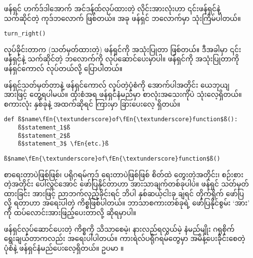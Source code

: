 ဖန်ရှင် ဟက်ဒ်ဒါအောက် အင်ဒန့်ထ်လုပ်ထားတဲ့ လိုင်းအားလုံးဟာ ၎င်းဖန်ရှင်နဲ့ သက်ဆိုင်တဲ့ ကုဒ်ဘလောက် ဖြစ်တယ်။ အခု  ဖန်ရှင် ဘလောက်မှာ  သုံးကြိမ်ပါတယ်။ 
%
\setlength{\fboxsep}{0pt}
\begin{verbatim}
turn_right()
\end{verbatim}
%
လုပ်ခိုင်းတာက (သတ်မှတ်ထားတဲ့) ဖန်ရှင်ကို အသုံးပြုတာ ဖြစ်တယ်။ ဒီအခါမှာ ၎င်းဖန်ရှင်နဲ့ သက်ဆိုင်တဲ့ ဘလောက်ကို လုပ်ဆောင်ပေးမှာပါ။ ဖန်ရှင်ကို အသုံးပြုတာကို ဖန်ရှင်ကောလ်  လုပ်တယ်လို့ ပြောပါတယ်။

ဖန်ရှင်သတ်မှတ်တာနဲ့ ဖန်ရှင်ကောလ် လုပ်တဲ့ပုံစံကို အောက်ပါအတိုင်း ယေဘုယျအားဖြင့် တွေ့ရပါမယ်။  ထုံးစံအရ ဖန်ရှင်နံမည်မှာ စာလုံးအသေးကိုပဲ သုံးလေ့ရှိတယ်။ စကားလုံး နှစ်ခုနဲ့ အထက်ဆိုရင် ကြားမှာ  ခြားပေးလေ့ ရှိတယ်။ 
%
\setlength{\fboxsep}{0pt}
\begin{verbatim}
def ß$name\fEn{\textunderscore}of\fEn{\textunderscore}function$ß():
    ß$statement_1$ß
    ß$statement_2$ß
    ß$statement_3$ \fEn{etc.}ß
\end{verbatim}
%
\betweenminted{\medskipamount}
%
\setlength{\fboxsep}{0pt}
\begin{verbatim}
ß$name\fEn{\textunderscore}of\fEn{\textunderscore}function$ß()
\end{verbatim}
%

\begin{mytcboxflt}
\noindent {}
\vspace{0.75em}

\noindent စာရေးတာပဲဖြစ်ဖြစ်၊ ပရိုဂရမ်ကုဒ် ရေးတာပဲဖြစ်ဖြစ် စိတ်ထဲ တွေးတဲ့အတိုင်း၊ စဉ်းစားတဲ့အတိုင်း ပေါ်လွင်အောင် ဖော်ပြနိုင်တာဟာ အားသာချက်တစ်ခုပါပဲ။ ဖန်ရှင် သတ်မှတ်ထားခြင်း အားဖြင့် ညာဘက်လှည့်ခိုင်းရင်  ဘိပါ နှစ်ဆယ့်ငါးခု ချရင်   တိုက်ရိုက် ဖော်ပြလို့ ရတာဟာ အရေးပါတဲ့ ကိစ္စဖြစ်ပါတယ်။ ဘာသာစကားတစ်ခုရဲ့ ဖော်ပြနိုင်စွမ်း ‘အား’  ကို ထပ်လောင်းအားဖြည့်ပေးတာလို့ ဆိုရမှာပါ။
\vspace{0.75em}

ဖန်ရှင်လုပ်ဆောင်ပေးတဲ့ ကိစ္စကို သိသာစေမဲ့၊ နားလည်ရလွယ်မဲ့ နံမည်မျိုး ဂရုစိုက်ရွေးချယ်တာကလည်း အရေးပါပါတယ်။ ကားရဲလ်ပရိုဂရမ်တွေမှာ အမိန့်ပေးခိုင်းစေတဲ့ ပုံစံနဲ့ ဖန်ရှင်နံမည်ပေးလေ့ရှိတယ်။ ဥပမာ \fEn{,}  ။    
\end{mytcboxflt}


